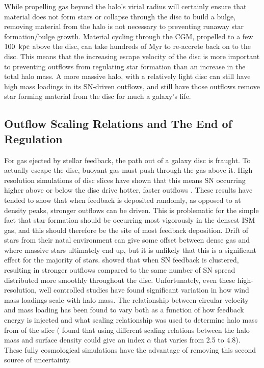 While propelling
gas beyond the halo's virial radius will certainly ensure that material does not
form stars or collapse through the disc to build a bulge, removing material from
the halo is not necessary to preventing runaway star formation/bulge growth.
Material cycling through the CGM, propelled to a few $100\;\>{\rm kpc}$ above the disc,
can take hundreds of Myr to re-accrete back on to the disc.  This means that the
increasing escape velocity of the disc is more important to preventing outflows
from regulating star formation than an increase in the total halo mass.  A more
massive halo, with a relatively light disc can still have high mass loadings in
its SN-driven outflows, and still have those outflows remove star forming
material from the disc for much a galaxy's life.

\subsection{Outflow Scaling Relations and The End of Regulation}
For gas ejected by stellar feedback, the path out of a galaxy disc is fraught.
To actually escape the disc, buoyant gas must push through the gas above it.
High resolution simulations of disc slices have shown that this means SN
occurring higher above or below the disc drive hotter, faster outflows
\citep{vonGlasow2013,Sarkar2015}.  These results have tended to show that when
feedback is deposited randomly, as opposed to at density peaks, stronger
outflows can be driven.  This is problematic for the simple fact that star
formation should be occurring most vigorously in the densest ISM gas, and this
should therefore be the site of most feedback deposition.  Drift of stars from
their natal environment can give some offset between dense gas and where massive
stars ultimately end up, but it is unlikely that this is a significant effect
for the majority of stars.  \citet{Governato2010,vonGlasow2013,Christensen2016}
showed that when SN feedback is clustered, resulting in stronger outflows
compared to the same number of SN spread
distributed more smoothly throughout the disc.  Unfortunately, even these
high-resolution, well controlled studies have found significant variation in how
wind mass loadings scale with halo mass.  The relationship between circular
velocity and mass loading has been found to vary both as a function of how
feedback energy is injected \citep{vonGlasow2013} and what scaling relationship
was used to determine halo mass from of the slice (\citet{Creasey2013} found
that using different scaling relations between the halo mass and surface density
could give an index $\alpha$ that varies from 2.5 to 4.8).  These fully cosmological
simulations have the advantage of removing this second source of uncertainty.

